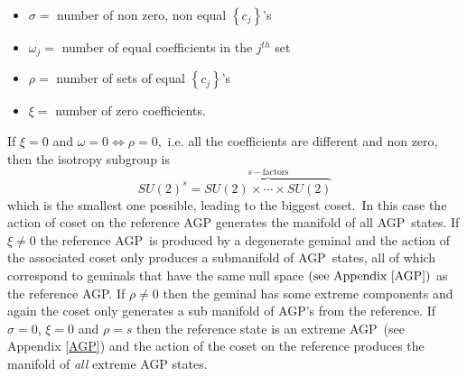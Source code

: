 \documentclass[aps,preprint]{revtex4}%
\begin{document}
\begin{description}
\item
\begin{itemize}
\item $\sigma=$ number of non zero, non equal $\left\{  c_{j}\right\}  $'s

\item $\omega_{j}=$ number of equal coefficients in the $j^{th}$ set

\item $\rho=$ number of sets of equal $\left\{  c_{j}\right\}  $'s

\item $\xi=$ number of zero coefficients.
\end{itemize}
\end{description}

If $\xi=0$ and $\omega=0\Leftrightarrow\rho=0,$ i.e. all the coefficients are
different and non zero, then the isotropy subgroup is
\begin{equation}
SU\left(  2\right)  ^{s}=\overset{s-\text{factors}}{\overbrace{SU\left(
2\right)  \times\cdots\times SU\left(  2\right)  }}%
\end{equation}
which is the smallest one possible, leading to the biggest coset.\ In this
case the action of coset on the reference AGP generates the manifold of all
AGP\ states. If $\xi\neq0$ the reference AGP\ is produced by a degenerate
geminal and the action of the associated coset only produces a submanifold of
AGP\ states, all of which correspond to geminals that have the same null space
$\left(  \text{see Appendix \ref{AGP}}\right)  $ as the reference AGP. If
$\rho\neq0$ then the geminal has some extreme components and again the coset
only generates a sub manifold of AGP's from the reference. If $\sigma=0$,
$\xi=0$ and $\rho=s$ then the reference state is an extreme AGP\ (see Appendix
\ref{AGP}) and the action of the coset on the reference produces the manifold
of \emph{all }extreme AGP states.
\end{document}
